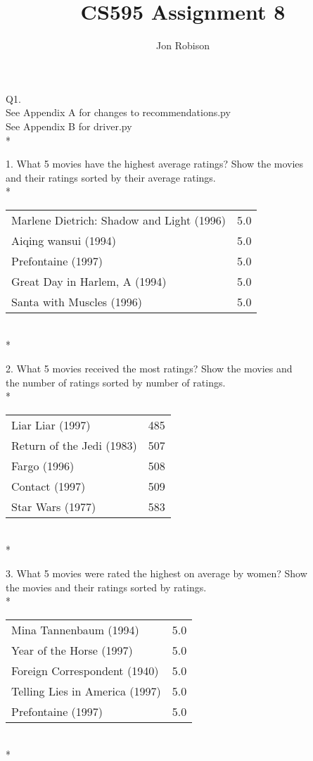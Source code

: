 \documentclass{article}
\begin{document}
\author{Jon Robison}
\title{CS595 Assignment 8}
\maketitle

Q1. \\
See Appendix A for changes to recommendations.py\\
See Appendix B for driver.py\\*

1.  What 5 movies have the highest average ratings? Show the movies\\
and their ratings sorted by their average ratings.\\*
\begin{tabular}{ l r }
Marlene Dietrich: Shadow and Light (1996) & 5.0 \\
Aiqing wansui (1994) & 5.0 \\
Prefontaine (1997) & 5.0 \\
Great Day in Harlem, A (1994) & 5.0 \\
Santa with Muscles (1996) & 5.0 \\
\end{tabular}
\\*

2.  What 5 movies received the most ratings? Show the movies and\\
the number of ratings sorted by number of ratings.\\*
\begin{tabular}{ l r }
Liar Liar (1997)& 485 \\
Return of the Jedi (1983) & 507 \\
Fargo (1996) & 508 \\
Contact (1997) & 509 \\
Star Wars (1977) & 583 \\
\end{tabular}
\\*

3.  What 5 movies were rated the highest on average by women? Show\\
the movies and their ratings sorted by ratings.\\*
\begin{tabular}{ l r }
Mina Tannenbaum (1994) & 5.0 \\
Year of the Horse (1997) & 5.0 \\
Foreign Correspondent (1940) & 5.0 \\
Telling Lies in America (1997) & 5.0 \\
Prefontaine (1997) & 5.0 \\
\end{tabular}
\\*
\end{document}
